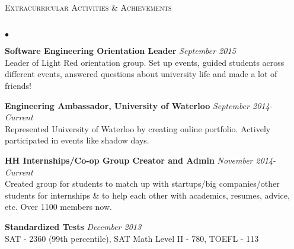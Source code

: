 \documentclass[10pt]{article}
\newcommand{\lineunder}{\vspace*{-8pt} \\ \hspace*{-18pt} \hrulefill \\}
\newcommand{\header}[1]{{\hspace*{-15pt}\vspace*{6pt} \textsc{#1}} \vspace*{-6pt} \lineunder}
\newenvironment{achievements}{\begin{list}{$\bullet$}{\topsep 0pt \itemsep -1.5pt \leftmargin 5pt}}{\vspace*{4pt}\end{list}}
\begin{document}
\header{\normalsize Extracurricular Activities \& Achievements}
\begin{achievements}
\item \textbf{Software Engineering Orientation Leader} \hfill \textit {September 2015}
\\ Leader of Light Red orientation group. Set up events, guided students across different events, answered questions about university life and made a lot of friends!
\item \textbf{Engineering Ambassador, University of Waterloo} \hfill \textit {September 2014- Current}
\\ Represented University of Waterloo by creating online portfolio. Actively participated in events like shadow days.
\item \textbf{HH Internships/Co-op Group Creator and Admin} \hfill \textit {November 2014- Current}
\\ Created group for students to match up with startups/big companies/other students for internships \& to help each other with academics, resumes, advice, etc. Over 1100 members now.
\item \textbf{Standardized Tests} \hfill \textit {December 2013}
\\ SAT - 2360 (99th percentile), SAT Math Level II - 780, TOEFL - 113
\end{achievements}
\end{document}
